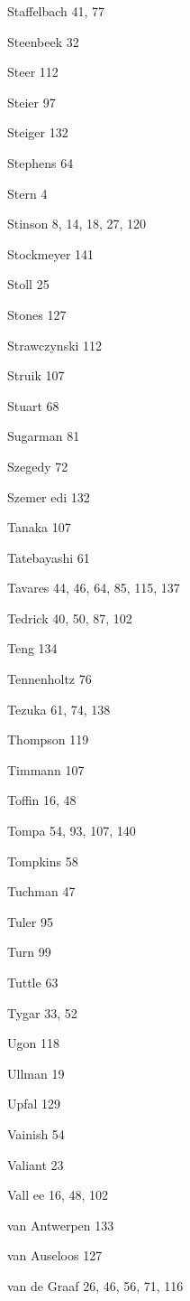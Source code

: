 \begin{theindex}
\item Staffelbach 41, 77
\item Steenbeek 32
\item Steer 112
\item Steier 97
\item Steiger 132
\item Stephens 64
\item Stern 4
\item Stinson 8, 14, 18, 27, 120
\item Stockmeyer 141
\item Stoll 25
\item Stones 127
\item Strawczynski 112
\item Struik 107
\item Stuart 68
\item Sugarman 81
\item Szegedy 72
\item Szemer{ e}di 132
\item Tanaka 107
\item Tatebayashi 61
\item Tavares 44, 46, 64, 85, 115, 137
\item Tedrick 40, 50, 87, 102
\item Teng 134
\item Tennenholtz 76
\item Tezuka 61, 74, 138
\item Thompson 119
\item Timmann 107
\item Toffin 16, 48
\item Tompa 54, 93, 107, 140
\item Tompkins 58
\item Tuchman 47
\item Tuler 95
\item Turn 99
\item Tuttle 63
\item Tygar 33, 52
\item Ugon 118
\item Ullman 19
\item Upfal 129
\item Vainish 54
\item Valiant 23
\item Vall{ e}e 16, 48, 102
\item {van Antwerpen} 133
\item {van Auseloos} 127
\item {van de Graaf} 26, 46, 56, 71, 116

\end{theindex}
